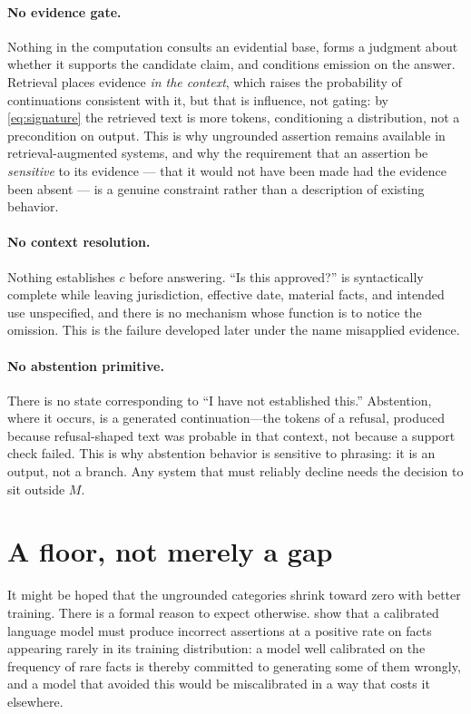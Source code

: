\paragraph{No evidence gate.} Nothing in the computation consults an evidential
base, forms a judgment about whether it supports the candidate claim, and
conditions emission on the answer. Retrieval places evidence \emph{in the
context}, which raises the probability of continuations consistent with it, but
that is influence, not gating: by \eqref{eq:signature} the retrieved text is more
tokens, conditioning a distribution, not a precondition on output. This is why ungrounded
assertion remains available in retrieval-augmented systems, and why the requirement that
an assertion be \emph{sensitive} to its evidence --- that it would not have been made
had the evidence been absent --- is a genuine constraint rather than a description of
existing behavior.

\paragraph{No context resolution.} Nothing establishes $c$ before answering.
``Is this approved?'' is syntactically complete while leaving jurisdiction,
effective date, material facts, and intended use unspecified, and there is no
mechanism whose function is to notice the omission. This is the failure developed
later under the name misapplied evidence.

\paragraph{No abstention primitive.} There is no state corresponding to ``I have
not established this.'' Abstention, where it occurs, is a generated
continuation---the tokens of a refusal, produced because refusal-shaped text was
probable in that context, not because a support check failed. This is why
abstention behavior is sensitive to phrasing: it is an output, not a branch. Any
system that must reliably decline needs the decision to sit outside $M$.

\section{A floor, not merely a gap}
\label{sec:floor}

It might be hoped that the ungrounded categories shrink toward zero with better
training. There is a formal reason to expect otherwise.
\citet{kalai2024} show that a calibrated language model must produce incorrect
assertions at a positive rate on facts appearing rarely in its training
distribution: a model well calibrated on the frequency of rare facts is thereby
committed to generating some of them wrongly, and a model that avoided this would
be miscalibrated in a way that costs it elsewhere.

